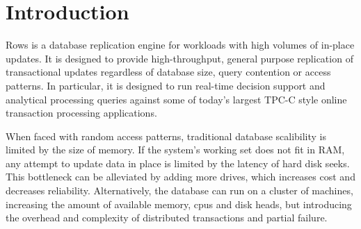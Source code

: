 \documentclass{sig-alternate-sigmod08}
\newcommand{\rows}{Rows\xspace}
\newcommand{\rowss}{Rows'\xspace}
\begin{document}
\begin{abstract}
\rowss throughput is limited by sequential I/O bandwidth.  We use
column compression to reduce this bottleneck.  Rather than reassemble
rows from a column-oriented disk layout, we adapt existing column
compression algorithms to a novel row-oriented data layout.  This
approach to database compression introduces negligible space overhead
and can be applied to most single-pass, randomly accessible
compression formats.  Our prototype uses lightweight (superscalar)
column compression algorithms.

Existing analytical models and our experiments reveal that, for disk and
CPU-bound workloads, \rows provides orders of magnitude greater
throughput than conventional replication techniques.

\end{abstract}





\section{Introduction}

\rows is a database replication engine for workloads with high volumes
of in-place updates.  It is designed to provide high-throughput,
general purpose replication of transactional updates regardless of
database size, query contention or access patterns.  In particular, it
is designed to run real-time decision support and analytical
processing queries against some of today's largest TPC-C style online
transaction processing applications.

When faced with random access patterns, traditional database
scalibility is limited by the size of memory.  If the system's working
set does not fit in RAM, any attempt to update data in place is
limited by the latency of hard disk seeks.  This bottleneck can be
alleviated by adding more drives, which increases cost and decreases
reliability.  Alternatively, the database can run on a cluster of
machines, increasing the amount of available memory, cpus and disk
heads, but introducing the overhead and complexity of distributed
transactions and partial failure.
\end{document}
